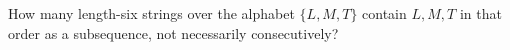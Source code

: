 How many length-six strings over the alphabet $\{L,M,T\}$ contain $L,M,T$ in that order as a subsequence, not necessarily consecutively?
